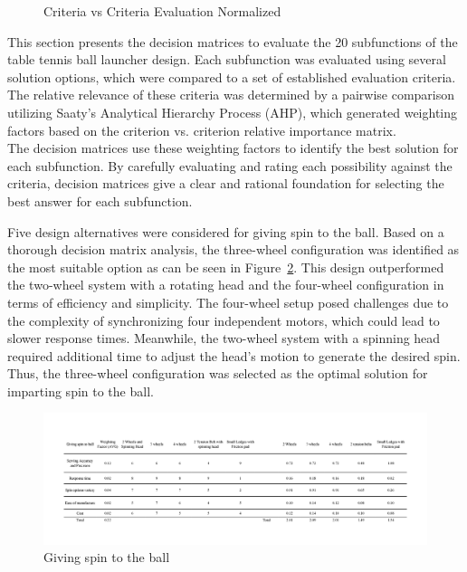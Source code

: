 \documentclass[12pt]{report}
\begin{document}
\begin{figure}[H]
    \centering
    \caption{Criteria vs Criteria Evaluation Normalized}
    \label{fig:cvc2} 
\end{figure}

This section presents the decision matrices to evaluate the 20 subfunctions of the table tennis ball launcher design. Each subfunction was evaluated using several solution options, which were compared to a set of established evaluation criteria. The relative relevance of these criteria was determined by a pairwise comparison utilizing Saaty's Analytical Hierarchy Process (AHP), which generated weighting factors based on the criterion vs. criterion relative importance matrix. \\

The decision matrices use these weighting factors to identify the best solution for each subfunction. By carefully evaluating and rating each possibility against the criteria, decision matrices give a clear and rational foundation for selecting the best answer for each subfunction.




Five design alternatives were considered for giving spin to the ball. Based on a thorough decision matrix analysis, the three-wheel configuration was identified as the most suitable option as can be seen in Figure~\ref{fig:spin}. This design outperformed the two-wheel system with a rotating head and the four-wheel configuration in terms of efficiency and simplicity. The four-wheel setup posed challenges due to the complexity of synchronizing four independent motors, which could lead to slower response times. Meanwhile, the two-wheel system with a spinning head required additional time to adjust the head's motion to generate the desired spin. Thus, the three-wheel configuration was selected as the optimal solution for imparting spin to the ball.
\begin{figure}[H]
    \centering
    \includegraphics[width=1\textwidth]{Decision matrices/spin.png}
    \caption{Giving spin to the ball}
    \label{fig:spin}
\end{figure}
\end{document}
